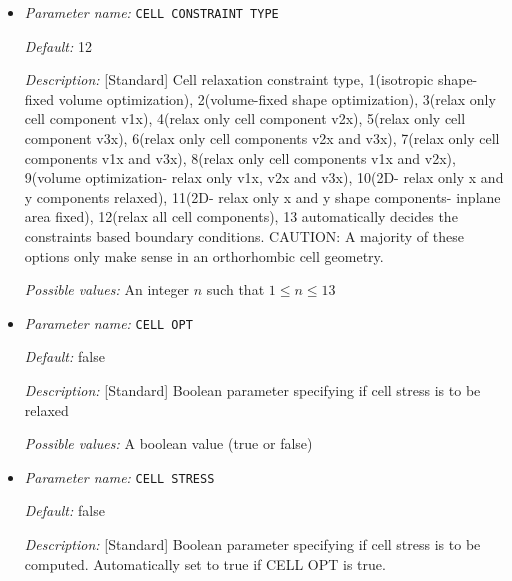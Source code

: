 \begin{itemize}
\item {\it Parameter name:} {\tt CELL CONSTRAINT TYPE}
\label{parameters:Geometry/Optimization/CELL CONSTRAINT TYPE}
\label{parameters:Geometry/Optimization/CELL_20CONSTRAINT_20TYPE}




{\it Default:} 12


{\it Description:} [Standard] Cell relaxation constraint type, 1(isotropic shape-fixed volume optimization), 2(volume-fixed shape optimization), 3(relax only cell component v1x), 4(relax only cell component v2x), 5(relax only cell component v3x), 6(relax only cell components v2x and v3x), 7(relax only cell components v1x and v3x), 8(relax only cell components v1x and v2x), 9(volume optimization- relax only v1x, v2x and v3x), 10(2D- relax only x and y components relaxed), 11(2D- relax only x and y shape components- inplane area fixed), 12(relax all cell components), 13 automatically decides the constraints based boundary conditions. CAUTION: A majority of these options only make sense in an orthorhombic cell geometry.


{\it Possible values:} An integer $n$ such that $1\leq n \leq 13$
\item {\it Parameter name:} {\tt CELL OPT}
\label{parameters:Geometry/Optimization/CELL OPT}
\label{parameters:Geometry/Optimization/CELL_20OPT}




{\it Default:} false


{\it Description:} [Standard] Boolean parameter specifying if cell stress is to be relaxed


{\it Possible values:} A boolean value (true or false)
\item {\it Parameter name:} {\tt CELL STRESS}
\label{parameters:Geometry/Optimization/CELL STRESS}
\label{parameters:Geometry/Optimization/CELL_20STRESS}




{\it Default:} false


{\it Description:} [Standard] Boolean parameter specifying if cell stress is to be computed. Automatically set to true if CELL OPT is true.



\end{itemize}
